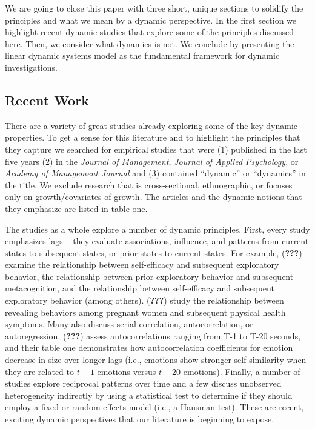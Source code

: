 \documentclass[english,,man]{apa6}
\theoremstyle{definition}
\theoremstyle{definition}
\theoremstyle{definition}
\theoremstyle{remark}
\begin{document}
We are going to close this paper with three short, unique sections to
solidify the principles and what we mean by a dynamic perspective. In
the first section we highlight recent dynamic studies that explore some
of the principles discussed here. Then, we consider what dynamics is
not. We conclude by presenting the linear dynamic systems model as the
fundamental framework for dynamic investigations.

\hypertarget{recent-work}{%
\subsection{Recent Work}\label{recent-work}}

There are a variety of great studies already exploring some of the key
dynamic properties. To get a sense for this literature and to highlight
the principles that they capture we searched for empirical studies that
were (1) published in the last five years (2) in the \emph{Journal of
Management}, \emph{Journal of Applied Psychology}, or \emph{Academy of
Management Journal} and (3) contained \enquote{dynamic} or
\enquote{dynamics} in the title. We exclude research that is
cross-sectional, ethnographic, or focuses only on growth/covariates of
growth. The articles and the dynamic notions that they emphasize are
listed in table one.

The studies as a whole explore a number of dynamic principles. First,
every study emphasizes lags -- they evaluate associations, influence,
and patterns from current states to subsequent states, or prior states
to current states. For example, ({\textbf{???}}) examine the
relationship between self-efficacy and subsequent exploratory behavior,
the relationship between prior exploratory behavior and subsequent
metacognition, and the relationship between self-efficacy and subsequent
exploratory behavior (among others). ({\textbf{???}}) study the
relationship between revealing behaviors among pregnant women and
subsequent physical health symptoms. Many also discuss serial
correlation, autocorrelation, or autoregression. ({\textbf{???}}) assess
autocorrelations ranging from T-1 to T-20 seconds, and their table one
demonstrates how autocorrelation coefficients for emotion decrease in
size over longer lags (i.e., emotions show stronger self-similarity when
they are related to \(t-1\) emotions versus \(t-20\) emotions). Finally,
a number of studies explore reciprocal patterns over time and a few
discuss unobserved heterogeneity indirectly by using a statistical test
to determine if they should employ a fixed or random effects model
(i.e., a Hausman test). These are recent, exciting dynamic perspectives
that our literature is beginning to expose.
\end{document}
